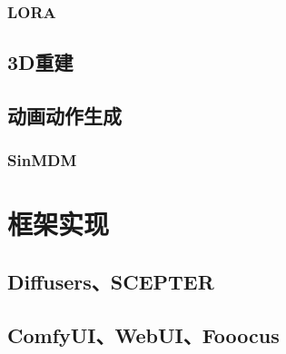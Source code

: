 \subsubsection{LORA}
\subsection{3D重建}
\subsection{动画动作生成}
\subsubsection{SinMDM}

\section{框架实现}
\subsection{Diffusers、SCEPTER}
\subsection{ComfyUI、WebUI、Fooocus}
